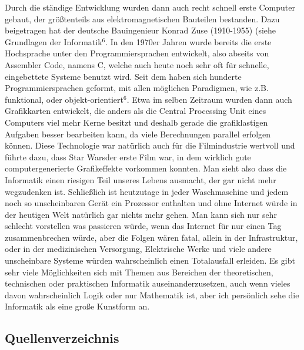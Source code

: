 \documentclass[12pt]{scrartcl}
\begin{document}
\newline
Durch die ständige Entwicklung wurden dann auch recht schnell erste Computer gebaut, der größtenteils aus elektromagnetischen Bauteilen bestanden. Dazu beigetragen hat der deutsche Bauingenieur Konrad Zuse (1910-1955) (siehe \glqq Grundlagen der Informatik\grqq$^6$.
\newline
In den 1970er Jahren wurde bereits die erste Hochsprache unter den Programmiersprachen entwickelt, also abseits von Assembler Code, namens \glqq C\grqq , welche auch heute noch sehr oft für schnelle, eingebettete Systeme benutzt wird. Seit dem haben sich hunderte Programmiersprachen geformt, mit allen möglichen Paradigmen, wie z.B. funktional, oder objekt-orientiert$^6$.
\newline
\newline
Etwa im selben Zeitraum wurden dann auch Grafikkarten entwickelt, die anders als die Central Processing Unit eines Computers viel mehr Kerne besitzt und deshalb gerade die grafiklastigen Aufgaben besser bearbeiten kann, da viele Berechnungen parallel erfolgen können. Diese Technologie war natürlich auch für die Filmindustrie wertvoll und führte dazu, dass \glqq Star Wars\grqq  der erste Film war, in dem wirklich gute computergenerierte Grafikeffekte vorkommen konnten.
\newline
\newline
Man sieht also dass die Informatik einen riesigen Teil unseres Lebens ausmacht, der gar nicht mehr wegzudenken ist. Schließlich ist heutzutage in jeder Waschmaschine und jedem noch so unscheinbaren Gerät ein Prozessor enthalten und ohne Internet würde in der heutigen Welt natürlich gar nichts mehr gehen. Man kann sich nur sehr schlecht vorstellen was passieren würde, wenn das Internet für nur einen Tag zusammenbrechen würde, aber die Folgen wären fatal, allein in der Infrastruktur, oder in der medizinischen Versorgung, Elektrische Werke und viele andere unscheinbare Systeme würden wahrscheinlich einen Totalausfall erleiden.
\newline
\newline
Es gibt sehr viele Möglichkeiten sich mit Themen aus Bereichen der theoretischen, technischen oder praktischen Informatik auseinanderzusetzen, auch wenn vieles davon wahrscheinlich Logik oder nur Mathematik ist, aber ich persönlich sehe die Informatik als eine große Kunstform an.

\newpage

\subsection{Quellenverzeichnis}
\end{document}
